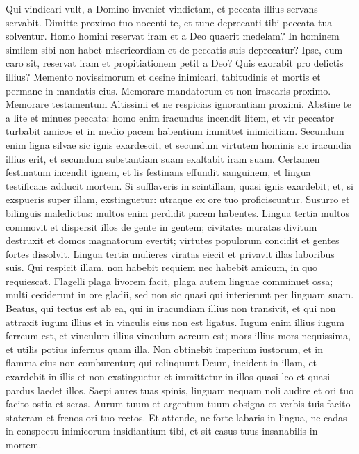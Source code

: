 \begin{biblechapter}  
\verse Qui vindicari vult, a Domino inveniet vindictam, et peccata illius servans servabit. 
\verse Dimitte proximo tuo nocenti te, et tunc deprecanti tibi peccata tua solventur. 
\verse Homo homini reservat iram et a Deo quaerit medelam? 
\verse In hominem similem sibi non habet misericordiam et de peccatis suis deprecatur? 
\verse Ipse, cum caro sit, reservat iram et propitiationem petit a Deo? Quis exorabit pro delictis illius? 
\verse Memento novissimorum et desine inimicari, 
\verse tabitudinis et mortis et permane in mandatis eius. 
\verse Memorare mandatorum et non irascaris proximo. 
\verse Memorare testamentum Altissimi et ne respicias ignorantiam proximi. 
\verse Abstine te a lite et minues peccata: 
\verse homo enim iracundus incendit litem, et vir peccator turbabit amicos et in medio pacem habentium immittet inimicitiam. 
\verse Secundum enim ligna silvae sic ignis exardescit, et secundum virtutem hominis sic iracundia illius erit, et secundum substantiam suam exaltabit iram suam. 
\verse Certamen festinatum incendit ignem, et lis festinans effundit sanguinem, et lingua testificans adducit mortem. 
\verse Si sufflaveris in scintillam, quasi ignis exardebit; et, si exspueris super illam, exstinguetur: utraque ex ore tuo proficiscuntur. 
\verse Susurro et bilinguis maledictus: multos enim perdidit pacem habentes. 
\verse Lingua tertia multos commovit et dispersit illos de gente in gentem; 
\verse civitates muratas divitum destruxit et domos magnatorum evertit; 
\verse virtutes populorum concidit et gentes fortes dissolvit. 
\verse Lingua tertia mulieres viratas eiecit et privavit illas laboribus suis. 
\verse Qui respicit illam, non habebit requiem nec habebit amicum, in quo requiescat. 
\verse Flagelli plaga livorem facit, plaga autem linguae comminuet ossa; 
\verse multi ceciderunt in ore gladii, sed non sic quasi qui interierunt per linguam suam. 
\verse Beatus, qui tectus est ab ea, qui in iracundiam illius non transivit, et qui non attraxit iugum illius et in vinculis eius non est ligatus. 
\verse Iugum enim illius iugum ferreum est, et vinculum illius vinculum aereum est; 
\verse mors illius mors nequissima, et utilis potius infernus quam illa. 
\verse Non obtinebit imperium iustorum, et in flamma eius non comburentur; 
\verse qui relinquunt Deum, incident in illam, et exardebit in illis et non exstinguetur et immittetur in illos quasi leo et quasi pardus laedet illos. 
\verse Saepi aures tuas spinis, linguam nequam noli audire et ori tuo facito ostia et seras. 
\verse Aurum tuum et argentum tuum obsigna et verbis tuis facito stateram et frenos ori tuo rectos. 
\verse Et attende, ne forte labaris in lingua, ne cadas in conspectu inimicorum insidiantium tibi, et sit casus tuus insanabilis in mortem. 
\end{biblechapter}

